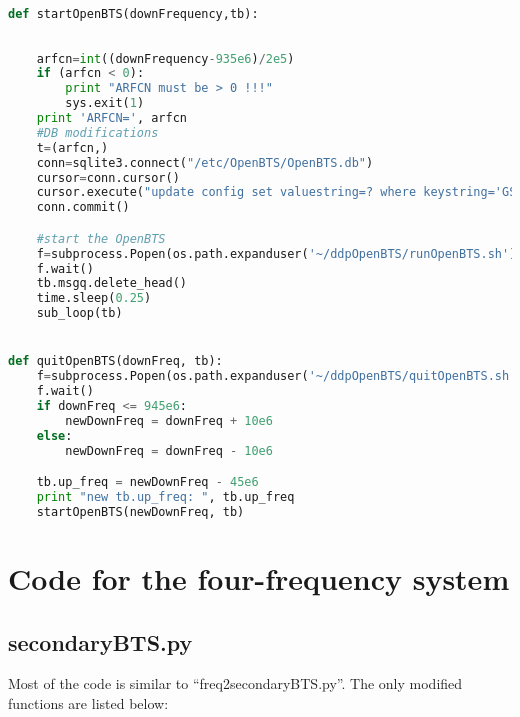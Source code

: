 \begin{lstlisting}[language=Python]
                
def startOpenBTS(downFrequency,tb):
    
    
    arfcn=int((downFrequency-935e6)/2e5)
    if (arfcn < 0):
        print "ARFCN must be > 0 !!!"
        sys.exit(1)
    print 'ARFCN=', arfcn
    #DB modifications
    t=(arfcn,)
    conn=sqlite3.connect("/etc/OpenBTS/OpenBTS.db")
    cursor=conn.cursor()
    cursor.execute("update config set valuestring=? where keystring='GSM.Radio.C0'",t)
    conn.commit()

    #start the OpenBTS
    f=subprocess.Popen(os.path.expanduser('~/ddpOpenBTS/runOpenBTS.sh'))
    f.wait()
    tb.msgq.delete_head()
    time.sleep(0.25)
    sub_loop(tb)


def quitOpenBTS(downFreq, tb):
    f=subprocess.Popen(os.path.expanduser('~/ddpOpenBTS/quitOpenBTS.sh'))
    f.wait()
    if downFreq <= 945e6:
        newDownFreq = downFreq + 10e6
    else:
        newDownFreq = downFreq - 10e6

    tb.up_freq = newDownFreq - 45e6
    print "new tb.up_freq: ", tb.up_freq
    startOpenBTS(newDownFreq, tb)
\end{lstlisting}






\section{Code for the four-frequency system}
\subsection{secondaryBTS.py}

Most of the code is similar to ``freq2secondaryBTS.py''. The only modified 
functions are listed below:

